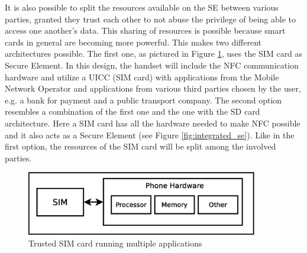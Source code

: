 \begin{enumerate}
\begin{item}
It is also possible to split the resources available on the SE between various parties, granted they trust each other to not abuse the privilege of being able to access one another's data.
This sharing of resources is possible because smart cards in general are becoming more powerful.
This makes two different architectures possible.
The first one, as pictured in Figure \ref{fig:sim_se}, uses the SIM card as Secure Element.
In this design, the handset will include the NFC communication hardware and utilize a UICC (SIM card) with applications from the Mobile Network Operator and applications from various third parties chosen by the user, e.g. a bank for payment and a public transport company. 
The second option resembles a combination of the first one and the one with the SD card architecture.
Here a SIM card has all the hardware needed to make NFC possible and it also acts as a Secure Element (see Figure \ref{fig:integrated_se}).
Like in the first option, the resources of the SIM card will be split among the involved parties.
\begin{figure}
\includegraphics[width=0.9\textwidth]{images/SIM_is_SE}
\caption[Trusted SIM cards]
{
Trusted SIM card running multiple applications
}
\label{fig:sim_se}
\end{figure}
\end{item}

\end{enumerate}







